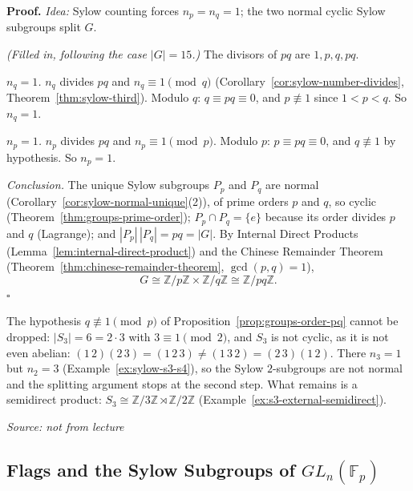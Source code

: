 \documentclass[11pt]{report}
\renewenvironment{proof}[1][Proof]{\noindent\textbf{#1.} }{\hfill$\square$\par\vspace{5pt}}
\newcommand{\srcline}[1]{\par\hfill{\footnotesize\textit{Source: #1}}}
\begin{document}
\begin{proof}
\textit{Idea:} Sylow counting forces $n_p = n_q = 1$; the two normal cyclic Sylow subgroups split $G$.\par
\textit{(Filled in, following the case $|G| = 15$.)} The divisors of $pq$ are $1, p, q, pq$.

\emph{$n_q = 1$.} $n_q$ divides $pq$ and $n_q \equiv 1 \pmod q$ (Corollary~\ref{cor:sylow-number-divides}, Theorem~\ref{thm:sylow-third}). Modulo $q$: $q \equiv pq \equiv 0$, and $p \not\equiv 1$ since $1 < p < q$. So $n_q = 1$.

\emph{$n_p = 1$.} $n_p$ divides $pq$ and $n_p \equiv 1 \pmod p$. Modulo $p$: $p \equiv pq \equiv 0$, and $q \not\equiv 1$ by hypothesis. So $n_p = 1$.

\emph{Conclusion.} The unique Sylow subgroups $P_p$ and $P_q$ are normal (Corollary~\ref{cor:sylow-normal-unique}(2)), of prime orders $p$ and $q$, so cyclic (Theorem~\ref{thm:groups-prime-order}); $P_p \cap P_q = \{e\}$ because its order divides $p$ and $q$ (Lagrange); and $|P_p|\,|P_q| = pq = |G|$. By Internal Direct Products (Lemma~\ref{lem:internal-direct-product}) and the Chinese Remainder Theorem (Theorem~\ref{thm:chinese-remainder-theorem}, $\gcd(p, q) = 1$),
\[ G \cong \mathbb{Z}/p\mathbb{Z} \times \mathbb{Z}/q\mathbb{Z} \cong \mathbb{Z}/pq\mathbb{Z}. \]
\end{proof}

\begin{exbox}\label{ex:order-pq-hypothesis-s3}
The hypothesis $q \not\equiv 1 \pmod p$ of Proposition~\ref{prop:groups-order-pq} cannot be dropped: $|S_3| = 6 = 2 \cdot 3$ with $3 \equiv 1 \pmod 2$, and $S_3$ is not cyclic, as it is not even abelian: $(1\,2)(2\,3) = (1\,2\,3) \neq (1\,3\,2) = (2\,3)(1\,2)$. There $n_3 = 1$ but $n_2 = 3$ (Example~\ref{ex:sylow-s3-s4}), so the Sylow $2$-subgroups are not normal and the splitting argument stops at the second step. What remains is a semidirect product: $S_3 \cong \mathbb{Z}/3\mathbb{Z} \rtimes \mathbb{Z}/2\mathbb{Z}$ (Example~\ref{ex:s3-external-semidirect}).
\srcline{not from lecture}
\end{exbox}

\subsection{\texorpdfstring{Flags and the Sylow Subgroups of $GL_n(\mathbb{F}_p)$}{Flags and the Sylow Subgroups of GLn(Fp)}}\label{sub:flags-sylow-gln}
\end{document}

